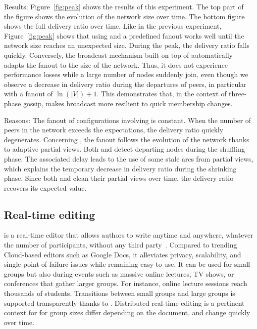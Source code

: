 \begin{asparadesc}
\item [Results:] Figure~\ref{fig:peak} shows the results of this
  experiment. The top part of the figure shows the evolution of the
  network size over time. The bottom figure shows the full delivery
  ratio over time. Like in the previous experiment,
  Figure~\ref{fig:peak} shows that using \CYCLON and a predefined
  fanout works well until the network size reaches an unexpected
  size. During the peak, the delivery ratio falls quickly. Conversely,
  the broadcast mechanism built on top of \SPRAY automatically adapts
  the fanout to the size of the network. Thus, it does not experience
  performance losses while a large number of nodes suddenly join, even
  though we observe a decrease in delivery ratio during the departures
  of peers, in particular with a fanout of $\ln(|V|)+1$. This
  demonstrates that, in the context of three-phase gossip, \SPRAY
  makes broadcast more resilient to quick membership changes.
\item [Reasons:] The fanout of configurations involving \CYCLON is
  constant. When the number of peers in the network exceeds the
  expectations, the delivery ratio quickly degenerates. Concerning
  \SPRAY, the fanout follows the evolution of the network thanks to
  adaptive partial views. Both \SPRAY and \CYCLON detect departing
  nodes during the shuffling phase. The associated delay leads to the
  use of some stale arcs from partial views, which explains the
  temporary decrease in delivery ratio during the shrinking
  phase. Since both \CYCLON and \SPRAY clean their partial views over
  time, the delivery ratio recovers its expected value.
\end{asparadesc}


\subsection{Real-time editing}

\CRATE is a real-time editor that allows authors to write anytime and
anywhere, whatever the number of participants, without any third
party~\cite{nedelec2016crate}. Compared to trending Cloud-based
editors such as Google Docs, it alleviates privacy, scalability, and
single-point-of-failure issues while remaining easy to use.  It can be
used for small groups but also during events such as massive online
lectures, TV shows, or conferences that gather larger groups. For
instance, online lecture sessions reach thousands of
students. Transitions between small groups and large groups is
supported transparently thanks to \SPRAY. Distributed real-time
editing is a pertinent context for \SPRAY for group sizes differ
depending on the document, and change quickly over time.

